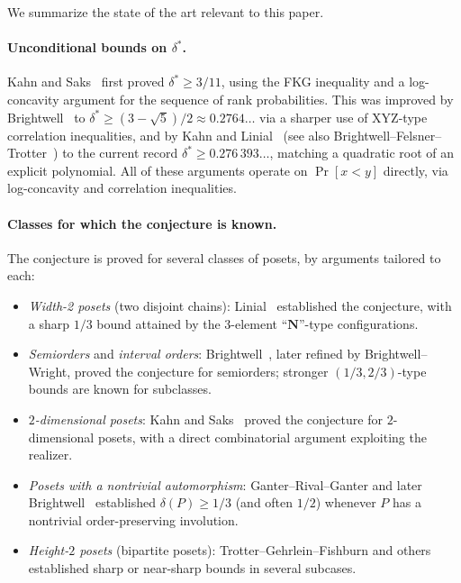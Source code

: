 \documentclass[11pt]{article}
\theoremstyle{definition}
\theoremstyle{remark}
\begin{document}
We summarize the state of the art relevant to this paper.

\paragraph{Unconditional bounds on $\delta^*$.}
Kahn and Saks~\cite{KahnSaks1984} first proved $\delta^*\ge 3/11$,
using the FKG inequality and a log-concavity argument for the sequence
of rank probabilities.  This was improved by
Brightwell~\cite{Brightwell1989} to $\delta^*\ge (3-\sqrt 5)/2\approx
0.2764\ldots$ via a sharper use of XYZ-type correlation inequalities,
and by Kahn and Linial~\cite{KahnLinial1991} (see also
Brightwell--Felsner--Trotter~\cite{BFT1995}) to the current record
$\delta^*\ge 0.276\,393\ldots$, matching a quadratic root of an
explicit polynomial.  All of these arguments operate on
$\Pr[x<y]$ directly, via log-concavity and correlation inequalities.

\paragraph{Classes for which the conjecture is known.}
The conjecture is proved for several classes of posets, by arguments
tailored to each:
\begin{itemize}\setlength{\itemsep}{2pt}
  \item \emph{Width-2 posets} (two disjoint chains):
    Linial~\cite{Linial1984} established the conjecture, with a
    sharp $1/3$ bound attained by the $3$-element
    ``$\mathbf{N}$''-type configurations.
  \item \emph{Semiorders} and \emph{interval orders}:
    Brightwell~\cite{Brightwell1989}, later refined by
    Brightwell--Wright, proved the conjecture for
    semiorders; stronger $(1/3,2/3)$-type bounds are
    known for subclasses.
  \item \emph{$2$-dimensional posets}: Kahn and
    Saks~\cite{KahnSaks1984} proved the conjecture for
    $2$-dimensional posets, with a direct combinatorial argument
    exploiting the realizer.
  \item \emph{Posets with a nontrivial automorphism}:
    Ganter--Rival--Ganter and later
    Brightwell~\cite{Brightwell1999} established
    $\delta(P)\ge 1/3$ (and often $1/2$) whenever $P$ has a
    nontrivial order-preserving involution.
  \item \emph{Height-$2$ posets} (bipartite posets):
    Trotter--Gehrlein--Fishburn and others established sharp or
    near-sharp bounds in several subcases.
\end{itemize}
\end{document}
